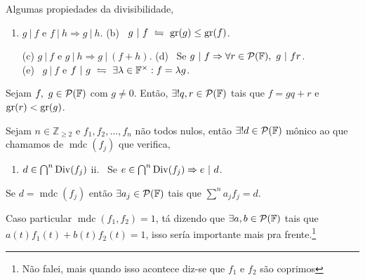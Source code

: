 \begin{proposition}
    \label{prop:0.2}
    Algumas propiedades da divisibilidade, 
    \begin{enumerate}[left = 0.55cm, label = (\alph*)]
        \item \(g \ | \ f\) e \(f \ | \ h \Rightarrow g\ | \ h \).\hspace{3cm} (b) \ \(g \ | \ f \ \leftrightharpoons\  \operatorname{gr}(g) \leq \operatorname{gr}(f)\).   
        \item[(c)] \(g\ | \ f \) e \(g \ | \ h\Rightarrow g\ | \ (f+h)\). \hspace{1.5cm }  (d) \ Se \(g\ | \ f \Rightarrow  \forall r \in \mathcal{P}(\mathbb{F}), \   g \ | \ f r\).  \vspace{-0.4cm}\\ 
        \- \hspace{2.7cm}(e) \ \(g \ | \ f\) e \(f \ | \ g \ \leftrightharpoons \ \exists \lambda \in \mathbb{F}^{\times}: f = \lambda g\).  
    \end{enumerate}
\end{proposition}

\theoremnum{ \ \hspace{-0.5cm}}
\begin{theorem}
    Sejam \(f, \ g \in \mathcal{P}(\mathbb{F})\) com \(g\neq 0\). Então, \(\exists ! q, r \in \mathcal{P}(\mathbb{F}) \) tais que \(f = gq +r\) e \( \operatorname{gr}(r) < \operatorname{gr}(g)\). 
\end{theorem}

\newcommand{\mdc}{\operatorname{mdc}}
\theoremnum{\ \hspace{-0.3cm}}
\begin{theorem}
    Sejam \(n\in \mathbb{Z}_{\geq 2}\) e \(f_1, f_2, \ldots, f_n\) não todos nulos, então \(\exists ! d \in \mathcal{P}(\mathbb{F})\) mônico ao que chamamos de \(\mdc(f_j)\) que verifica, 
    \begin{enumerate}[label=\roman*., left = 2cm]
        \item \(d \in \bigcap^n \operatorname{Div}(f_j)\) \hspace{2cm} ii. \ Se \(e \in \bigcap^n \operatorname{Div}(f_j)  \Rightarrow e \ | \ d\). 
    \end{enumerate}
\end{theorem}

\begin{theorem}
    \label{thm:bezout}
    Se \(d = \mdc(f_j)\) então \(\exists a_j \in \mathcal{P}(\mathbb{F})\) tais que \(\sum^n a_j f_j = d\). 
\end{theorem}

\begin{note}
    Caso particular \(\mdc(f_1, f_2)=1\), tá dizendo que \(\exists a, b \in \mathcal{P}(\mathbb{F})\) tais que \(a(t)f_1(t) + b(t)f_2(t)= 1\), isso sería importante mais pra frente.\footnote{Não falei, mais quando isso acontece diz-se que \(f_1\) e \(f_2\) são coprimos}
\end{note}